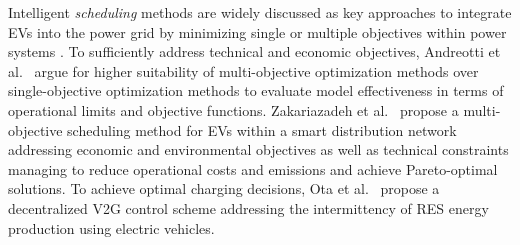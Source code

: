 %


Intelligent \textit{scheduling} methods are widely discussed as key approaches to integrate EVs into the power grid by minimizing single or multiple objectives within power systems \cite{yang2015computational}.
To sufficiently address technical and economic objectives, Andreotti et al.~\cite{andreotti2012review} argue for higher suitability of multi-objective optimization methods over single-objective optimization methods to evaluate model effectiveness in terms of operational limits and objective functions. 
Zakariazadeh et al.~\cite{zakariazadeh2014multi} propose a multi-objective scheduling method for EVs within a smart distribution network addressing economic and environmental objectives as well as technical constraints managing to reduce operational costs and emissions and achieve Pareto-optimal solutions.
To achieve optimal charging decisions, Ota et al.~\cite{ota2012autonomous} propose a decentralized V2G control scheme addressing the intermittency of RES energy production using electric vehicles. 
